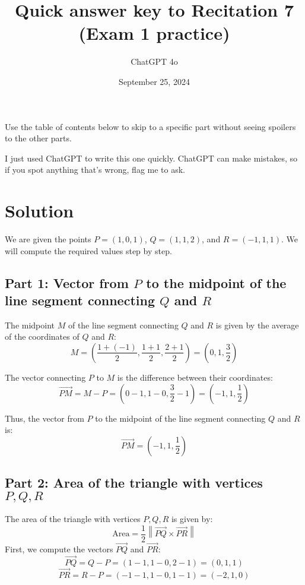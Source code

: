 \documentclass[11pt]{article}
\begin{document}
\title{Quick answer key to Recitation 7 (Exam 1 practice)}
\author{ChatGPT 4o}
\date{September 25, 2024}
\maketitle

Use the table of contents below to skip to a specific part
without seeing spoilers to the other parts.

I just used ChatGPT to write this one quickly.
ChatGPT can make mistakes, so if you spot anything that's wrong, flag me to ask.

\tableofcontents



\newpage

\section{Solution}

We are given the points \( P = (1, 0, 1) \), \( Q = (1, 1, 2) \), and \( R = (-1, 1, 1) \). We will compute the required values step by step.

\subsection{Part 1: Vector from \( P \) to the midpoint of the line segment connecting \( Q \) and \( R \)}

The midpoint \( M \) of the line segment connecting \( Q \) and \( R \) is given by the average of the coordinates of \( Q \) and \( R \):
\[
M = \left( \frac{1 + (-1)}{2}, \frac{1 + 1}{2}, \frac{2 + 1}{2} \right) = (0, 1, \frac{3}{2})
\]

The vector connecting \( P \) to \( M \) is the difference between their coordinates:
\[
\overrightarrow{PM} = M - P = (0 - 1, 1 - 0, \frac{3}{2} - 1) = (-1, 1, \frac{1}{2})
\]

Thus, the vector from \( P \) to the midpoint of the line segment connecting \( Q \) and \( R \) is:
\[
\overrightarrow{PM} = (-1, 1, \frac{1}{2})
\]

\newpage

\subsection{Part 2: Area of the triangle with vertices \( P, Q, R \)}

The area of the triangle with vertices \( P, Q, R \) is given by:
\[
\text{Area} = \frac{1}{2} \left\| \overrightarrow{PQ} \times \overrightarrow{PR} \right\|
\]
First, we compute the vectors \( \overrightarrow{PQ} \) and \( \overrightarrow{PR} \):
\[
\overrightarrow{PQ} = Q - P = (1 - 1, 1 - 0, 2 - 1) = (0, 1, 1)
\]
\[
\overrightarrow{PR} = R - P = (-1 - 1, 1 - 0, 1 - 1) = (-2, 1, 0)
\]
\end{document}
